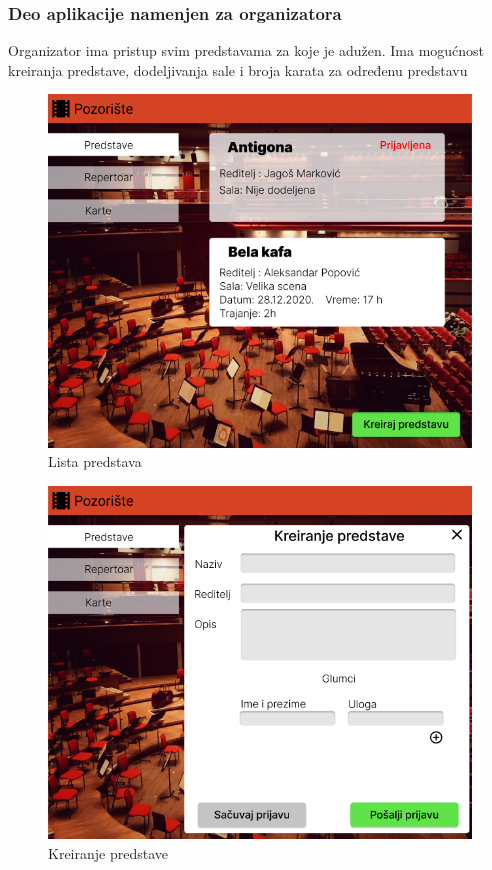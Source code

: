 \documentclass[a4paper]{article}
\begin{document}
\subsubsection{Deo aplikacije namenjen za organizatora}
Organizator ima pristup svim predstavama za koje je adužen. Ima mogućnost kreiranja predstave, dodeljivanja sale i broja karata za određenu predstavu

\begin{figure}[H]
  \begin{center}
    \includegraphics[width=130mm]{../images/organizator_lista_predstava.png}
  \end{center}
  \caption{Lista predstava}
  \label{organizator_lista_predstava}
\end{figure}

\begin{figure}[H]
  \begin{center}
    \includegraphics[width=130mm]{../images/organizator_kreiranje_predstave.png}
  \end{center}
  \caption{Kreiranje predstave}
  \label{organizator_kreiranje_predstave}
\end{figure}
\end{document}
